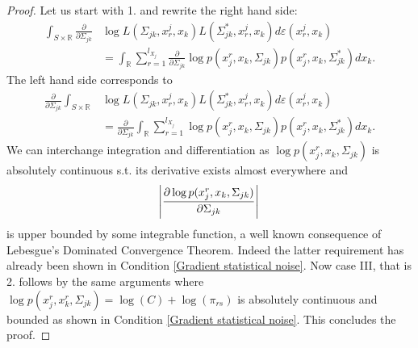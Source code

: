 \begin{lemma}
    \begin{proof}
        Let us start with 1. and rewrite the right hand side:
        \begin{align*}
            \int_{S\times \mathbb{R}} \frac{\partial }{\partial \Sigma_{jk}} &\log L(\Sigma_{jk}, x_r^j,x_k) L(\Sigma_{jk}^*, x_r^j,x_k) d\varepsilon(x_r^j,x_k) \\
            &= \int_\mathbb{R} \sum_{r=1}^{l_{X_j}} \frac{\partial }{\partial \Sigma_{jk}} \log p(x_j^{r},x_{k}, \Sigma_{jk}) p(x_j^{r},x_{k}, \Sigma^*_{jk}) dx_k.
        \end{align*}
        The left hand side corresponds to
        \begin{align*}
            \frac{\partial }{\partial \Sigma_{jk}} \int_{S\times \mathbb{R}} &\log L(\Sigma_{jk}, x_r^j,x_k) L(\Sigma_{jk}^*, x_r^j,x_k) d\varepsilon(x_r^j,x_k) \\
            &= \frac{\partial }{\partial \Sigma_{jk}} \int_\mathbb{R} \sum_{r=1}^{l_{X_j}} \log p(x_j^{r}, x_{k}, \Sigma_{jk}) p(x_j^{r},x_{k}, \Sigma_{jk}^*) dx_k.
        \end{align*}
        We can interchange integration and differentiation as $\log p(x_j^{r}, x_{k}, \Sigma_{jk})$ is absolutely continuous s.t. its derivative exists almost everywhere and 
        \begin{equation*}
            \abs{\frac{\partial \log p(x_j^{r}, x_{k}, \Sigma_{jk})}{\partial \Sigma_{jk}}}
        \end{equation*} is upper bounded by some integrable function, a well known consequence of Lebesgue's Dominated Convergence Theorem. Indeed the latter requirement has already been shown in Condition \ref{Gradient statistical noise}. Now case III, that is 2. follows by the same arguments where $\log p(x_j^{r}, x^r_{k}, \Sigma_{jk}) = \log(C) + \log(\pi_{rs})$ is absolutely continuous and bounded as shown in Condition \ref{Gradient statistical noise}. This concludes the proof.   
    \end{proof}
\end{lemma}


